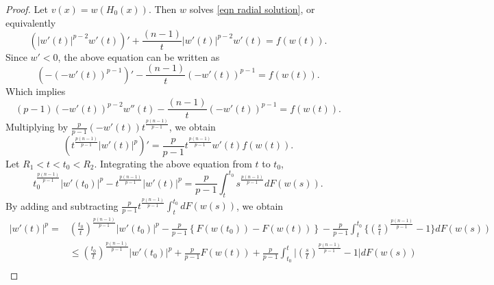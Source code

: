 \documentclass[11pt]{amsart}
\numberwithin{equation}{section}
\begin{document}
\begin{proof}
Let $v(x)=w(H_{0}(x))$. Then $w$ solves \eqref{eqn radial solution}, or equivalently 
\begin{equation*}
    \left(|w'(t)|^{p-2}w'(t)\right)'+\frac{(n-1)}{t}|w'(t)|^{p-2}w'(t)=f(w(t)).
\end{equation*}
Since $w'<0$, the above equation can be written as
\begin{equation*}
    \left(-(-w'(t))^{p-1}\right)'-\frac{(n-1)}{t}(-w'(t))^{p-1}=f(w(t)).
\end{equation*}
Which implies
\begin{equation*}
    (p-1)(-w'(t))^{p-2}w''(t)-\frac{(n-1)}{t}(-w'(t))^{p-1}=f(w(t)).
\end{equation*}
    Multiplying by $\frac{p}{p-1}(-w'(t))t^{\frac{p(n-1)}{p-1}}$, we obtain 
    \begin{equation*}
        \left(t^{\frac{p(n-1)}{p-1}}|w'(t)|^{p}\right)'=\frac{p}{p-1}t^{\frac{p(n-1)}{p-1}}w'(t)f(w(t)).
    \end{equation*}
    Let $R_{1}<t<t_{0}<R_{2}$. Integrating the above equation from $t$ to $t_{0}$,
    \begin{equation*}
        t_{0}^{\frac{p(n-1)}{p-1}}|w'(t_{0})|^{p}-t^{\frac{p(n-1)}{p-1}}|w'(t)|^{p}=\frac{p}{p-1}\int_{t}^{t_{0}}s^{\frac{p(n-1)}{p-1}}dF(w(s)).
    \end{equation*}
    By adding and subtracting $\frac{p}{p-1}t^{\frac{p(n-1)}{p-1}}\int_{t}^{t_{0}}dF(w(s))$,
    we obtain
    \begin{equation*}
        \begin{split}
            |w'(t)|^{p}=&\left(\frac{t_{0}}{t}\right)^{\frac{p(n-1)}{p-1}}|w'(t_{0})|^{p}-\frac{p}{p-1}\left\{F(w(t_{0}))-F(w(t))\right\}-\frac{p}{p-1}\int_{t}^{t_{0}}\bigg\{\left(\frac{s}{t}\right)^{\frac{p(n-1)}{p-1}}-1\bigg\}dF(w(s))\\
            &\leq \left(\frac{t_{0}}{t}\right)^{\frac{p(n-1)}{p-1}}|w'(t_{0})|^{p}+\frac{p}{p-1}F(w(t))+\frac{p}{p-1}\int_{t_{0}}^{t}\bigg|\left(\frac{s}{t}\right)^{\frac{p(n-1)}{p-1}}-1\bigg|dF(w(s))\\

\end{split}
\end{equation*}
\end{proof}
\end{document}
